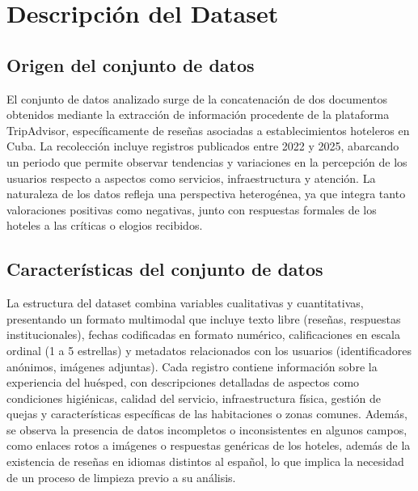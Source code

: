 \section*{Descripción del Dataset}

\subsection{Origen del conjunto de datos}

El conjunto de datos analizado surge de la concatenación de dos documentos obtenidos mediante la extracción de información procedente de la plataforma TripAdvisor, específicamente de reseñas asociadas a establecimientos hoteleros en Cuba. La recolección incluye registros publicados entre 2022 y 2025, abarcando un periodo que permite observar tendencias y variaciones en la percepción de los usuarios respecto a aspectos como servicios, infraestructura y atención. La naturaleza de los datos refleja una perspectiva heterogénea, ya que integra tanto valoraciones positivas como negativas, junto con respuestas formales de los hoteles a las críticas o elogios recibidos.  

\subsection{Características del conjunto de datos  } 
La estructura del dataset combina variables cualitativas y cuantitativas, presentando un formato multimodal que incluye texto libre (reseñas, respuestas institucionales), fechas codificadas en formato numérico, calificaciones en escala ordinal (1 a 5 estrellas) y metadatos relacionados con los usuarios (identificadores anónimos, imágenes adjuntas). Cada registro contiene información sobre la experiencia del huésped, con descripciones detalladas de aspectos como condiciones higiénicas, calidad del servicio, infraestructura física, gestión de quejas y características específicas de las habitaciones o zonas comunes. Además, se observa la presencia de datos incompletos o inconsistentes en algunos campos, como enlaces rotos a imágenes o respuestas genéricas de los hoteles, además de la existencia de reseñas en idiomas distintos al español, lo que implica la necesidad de un proceso de limpieza previo a su análisis.  

